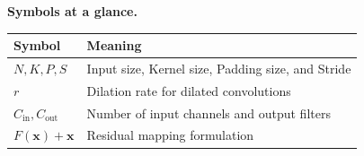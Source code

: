 \documentclass[a4paper,11pt]{article}
\begin{document}
\label{symb}
\medskip
\noindent\textbf{Symbols at a glance.}
\begin{center}\small
\begin{tabular}{@{}ll@{}}
\toprule \textbf{Symbol} & \textbf{Meaning} \\ \midrule
$N, K, P, S$ & Input size, Kernel size, Padding size, and Stride \\
$r$ & Dilation rate for dilated convolutions \\
$C_{\text{in}}, C_{\text{out}}$ & Number of input channels and output filters \\
$F(\mathbf{x}) + \mathbf{x}$ & Residual mapping formulation \\
\bottomrule
\end{tabular}
\end{center}
\end{document}

